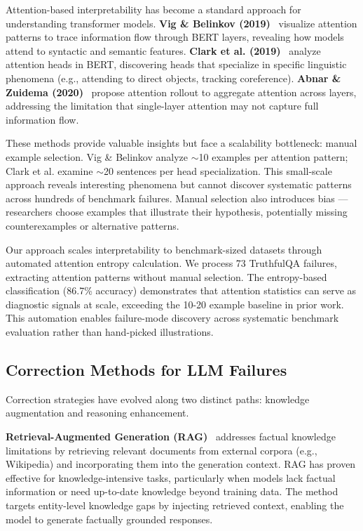 Attention-based interpretability has become a standard approach for understanding transformer models. \textbf{Vig \& Belinkov (2019)}~\cite{Vig2019AttentionViz} visualize attention patterns to trace information flow through BERT layers, revealing how models attend to syntactic and semantic features. \textbf{Clark et al. (2019)}~\cite{Clark2019BERTHeads} analyze attention heads in BERT, discovering heads that specialize in specific linguistic phenomena (e.g., attending to direct objects, tracking coreference). \textbf{Abnar \& Zuidema (2020)}~\cite{Abnar2020Attention} propose attention rollout to aggregate attention across layers, addressing the limitation that single-layer attention may not capture full information flow.

These methods provide valuable insights but face a scalability bottleneck: manual example selection. Vig \& Belinkov analyze $\sim$10 examples per attention pattern; Clark et al. examine $\sim$20 sentences per head specialization. This small-scale approach reveals interesting phenomena but cannot discover systematic patterns across hundreds of benchmark failures. Manual selection also introduces bias --- researchers choose examples that illustrate their hypothesis, potentially missing counterexamples or alternative patterns.

Our approach scales interpretability to benchmark-sized datasets through automated attention entropy calculation. We process 73 TruthfulQA failures, extracting attention patterns without manual selection. The entropy-based classification (86.7\% accuracy) demonstrates that attention statistics can serve as diagnostic signals at scale, exceeding the 10-20 example baseline in prior work. This automation enables failure-mode discovery across systematic benchmark evaluation rather than hand-picked illustrations.

\subsection{Correction Methods for LLM Failures}

Correction strategies have evolved along two distinct paths: knowledge augmentation and reasoning enhancement.

\textbf{Retrieval-Augmented Generation (RAG)}~\cite{Lewis2020RAG} addresses factual knowledge limitations by retrieving relevant documents from external corpora (e.g., Wikipedia) and incorporating them into the generation context. RAG has proven effective for knowledge-intensive tasks, particularly when models lack factual information or need up-to-date knowledge beyond training data. The method targets entity-level knowledge gaps by injecting retrieved context, enabling the model to generate factually grounded responses.

